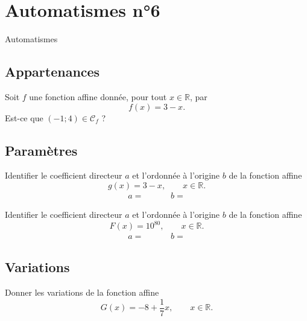 \documentclass[14pt]{beamer}
\newcommand{\R}{\mathbb{R}}
\begin{document}
\section{Automatismes n°6}

\begin{frame}

\centering \huge
Automatismes

\end{frame}

\subsection{Appartenances}

\begin{frame}{1}

	Soit $f$ une fonction affine donnée, pour tout $x\in\R$, par
		\[ f(x) = 3-x. \]
	Est-ce que $(-1;4) \in \mathcal{C}_f$ ?
\end{frame}

\subsection{Paramètres}

\begin{frame}{2}
    Identifier le coefficient directeur $a$ et l'ordonnée à l'origine $b$ de la fonction affine
		\[ g(x) = 3-x, \qquad x \in \R. \]
    \begin{align*}
        a = && && b=
    \end{align*}
\end{frame}

\begin{frame}{3}
    Identifier le coefficient directeur $a$ et l'ordonnée à l'origine $b$ de la fonction affine
		\[ F(x) = 10^{80}, \qquad x \in \R. \]
    \begin{align*}
        a = && && b=
    \end{align*}
\end{frame}

\subsection{Variations}

\begin{frame}{4}
    Donner les variations de la fonction affine
		\[ G(x) = -8 + \dfrac17 x, \qquad x \in \R. \]
\end{frame}
\end{document}
